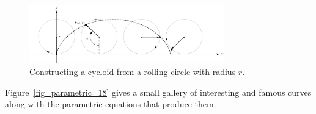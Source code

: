 \begin{figure}
	\begin{center}
			\includegraphics[width=0.75\textwidth]{fig_parametric_17}
	\caption{Constructing a cycloid from a rolling circle with radius $r$. }
	\label{fig_parametric_17}
	\end{center}
\end{figure}



\fi

Figure~\ref{fig_parametric_18} gives a small gallery of interesting and famous curves along with the parametric equations that produce them. 


